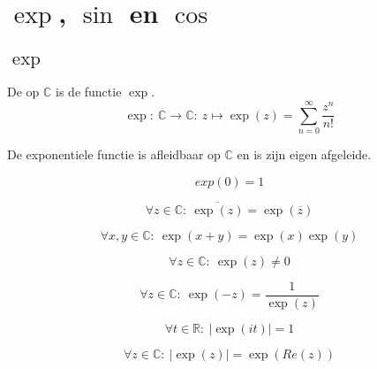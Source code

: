 \documentclass[main.tex]{subfiles}
\begin{document}
\section{$\exp$, $\sin$ en $\cos$}
\label{sec:exp-sin-en}

\subsection{$\exp$}
\label{sec:exp}

\begin{de}
  De  op $\mathbb{C}$ is de functie $\exp$.
  \[ \exp:\ \mathbb{C} \rightarrow \mathbb{C}:\ z \mapsto \exp(z) = \sum_{n=0}^{\infty}\frac{z^{n}}{n!} \]
\end{de}


\begin{bst}
  De exponentiele functie is afleidbaar op $\mathbb{C}$ en is zijn eigen afgeleide.
\end{bst}

\begin{bpr}
  \[ exp(0) = 1 \]

\end{bpr}

\begin{bpr}
  \[ \forall z \in \mathbb{C}:\ \overline{\exp(z)} = \exp(\overline{z}) \]
\end{bpr}

\begin{bpr}
  \[ \forall x,y \in \mathbb{C}:\ \exp(x+y) = \exp(x)\exp(y) \]
\end{bpr}

\begin{bpr}
  \[ \forall z \in \mathbb{C}:\ \exp(z) \neq 0 \]
\end{bpr}

\begin{bpr}
  \[ \forall z \in \mathbb{C}:\ \exp(-z) = \frac{1}{\exp(z)} \]
\end{bpr}

\begin{bpr}
  \[ \forall t \in \mathbb{R}:\ |\exp(it)| = 1 \]
\end{bpr}

\begin{bpr}
  \[ \forall z \in \mathbb{C}:\ |\exp(z)| = \exp(Re(z)) \]
\end{bpr}
\end{document}
